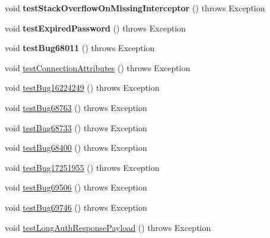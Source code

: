 \begin{DoxyCompactItemize}
void {\bfseries test\+Stack\+Overflow\+On\+Missing\+Interceptor} ()  throws Exception 
\item 
\mbox{\label{classtestsuite_1_1regression_1_1_connection_regression_test_a8e581b7d593b06e2deca5f2498c3de72}} 
void {\bfseries test\+Expired\+Password} ()  throws Exception 
\item 
\mbox{\label{classtestsuite_1_1regression_1_1_connection_regression_test_ac60d2ff752fb72c8a77535c0eb40638c}} 
void {\bfseries test\+Bug68011} ()  throws Exception 
\item 
void \mbox{\hyperlink{classtestsuite_1_1regression_1_1_connection_regression_test_ab031515e8ccff3b5b929eccb92f9ca64}{test\+Connection\+Attributes}} ()  throws Exception 
\item 
void \mbox{\hyperlink{classtestsuite_1_1regression_1_1_connection_regression_test_a24c8f315d33aa8259b7777c43e225b24}{test\+Bug16224249}} ()  throws Exception 
\item 
void \mbox{\hyperlink{classtestsuite_1_1regression_1_1_connection_regression_test_ad20cb3d4d184371c5cbf7e540726e6a6}{test\+Bug68763}} ()  throws Exception 
\item 
void \mbox{\hyperlink{classtestsuite_1_1regression_1_1_connection_regression_test_a9d54ba5c540e24424893bc15c83312ac}{test\+Bug68733}} ()  throws Exception 
\item 
void \mbox{\hyperlink{classtestsuite_1_1regression_1_1_connection_regression_test_a51c24689dc4bef4ba615be9fc98cf30a}{test\+Bug68400}} ()  throws Exception 
\item 
void \mbox{\hyperlink{classtestsuite_1_1regression_1_1_connection_regression_test_ad677d873884570b76279a42c590dbe5b}{test\+Bug17251955}} ()  throws Exception 
\item 
void \mbox{\hyperlink{classtestsuite_1_1regression_1_1_connection_regression_test_ac8bd9a129a96fb8c9d9c220369e1a5b2}{test\+Bug69506}} ()  throws Exception 
\item 
void \mbox{\hyperlink{classtestsuite_1_1regression_1_1_connection_regression_test_adeeac09d039c69e054e676529af26ca7}{test\+Bug69746}} ()  throws Exception 
\item 
void \mbox{\hyperlink{classtestsuite_1_1regression_1_1_connection_regression_test_a1f2f79b3fda5cc037b1fa079164289a5}{test\+Long\+Auth\+Response\+Payload}} ()  throws Exception 

\end{DoxyCompactItemize}
